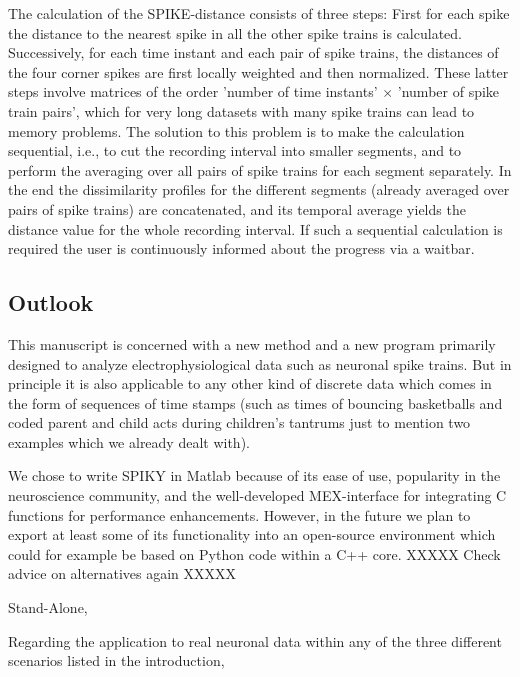 \documentclass[10pt,twocolumn]{elsart5p}
\begin{document}
The calculation of the SPIKE-distance consists of three steps: First for each spike the distance to the nearest spike in all the other spike trains is calculated. Successively, for each time instant and each pair of spike trains, the distances of the four corner spikes are first locally weighted and then normalized. These latter steps involve matrices of the order 'number of time instants' $\times$ 'number of spike train pairs', which for very long datasets with many spike trains can lead to memory problems. The solution to this problem is to make the calculation sequential, i.e., to cut the recording interval into smaller segments, and to perform the averaging over all pairs of spike trains for each segment separately. In the end the dissimilarity profiles for the different segments (already averaged over pairs of spike trains) are concatenated, and its temporal average yields the distance value for the whole recording interval. If such a sequential calculation is required the user is continuously informed about the progress via a waitbar.



\subsection{\label{ss:Outlook} Outlook}

This manuscript is concerned with a new method and a new program primarily designed to analyze electrophysiological data such as neuronal spike trains. But in principle it is also applicable to any other kind of discrete data which comes in the form of sequences of time stamps (such as times of bouncing basketballs and coded parent and child acts during children's tantrums just to mention two examples which we already dealt with).

We chose to write SPIKY in Matlab because of its ease of use, popularity in the neuroscience community, and the well-developed MEX-interface for integrating C functions for performance enhancements. However, in the future we plan to export at least some of its functionality into an open-source environment which could for example be based on Python code within a C++ core. XXXXX Check advice on alternatives again XXXXX

Stand-Alone, 

%

Regarding the application to real neuronal data within any of the three different scenarios listed in the introduction,
\end{document}
